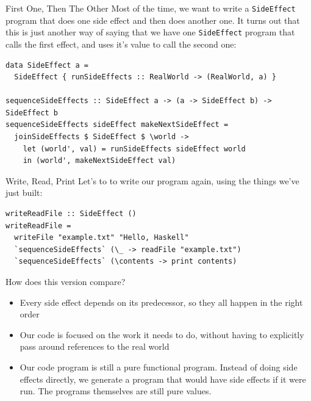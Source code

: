 \documentclass[10pt, presentation, colorlinks]{beamer}
\begin{document}
\begin{frame}[label={sec:org6ee2431},fragile]{First One, Then The Other}
 Most of the time, we want to write a \texttt{SideEffect} program that does
one side effect \alert{and then} does another one. It turns out that this is
just another way of saying that we have one \texttt{SideEffect} program that
calls the first effect, and uses it's value to call the second one:

\begin{verbatim}
data SideEffect a =
  SideEffect { runSideEffects :: RealWorld -> (RealWorld, a) }

sequenceSideEffects :: SideEffect a -> (a -> SideEffect b) -> SideEffect b
sequenceSideEffects sideEffect makeNextSideEffect =
  joinSideEffects $ SideEffect $ \world ->
    let (world', val) = runSideEffects sideEffect world
    in (world', makeNextSideEffect val)
\end{verbatim}
\end{frame}

\begin{frame}[label={sec:org48d9e75},fragile]{Write, Read, Print}
 Let's to to write our program again, using the things we've just built:

\begin{verbatim}
writeReadFile :: SideEffect ()
writeReadFile =
  writeFile "example.txt" "Hello, Haskell"
  `sequenceSideEffects` (\_ -> readFile "example.txt")
  `sequenceSideEffects` (\contents -> print contents)
\end{verbatim}

\bigskip

How does this version compare?

\bigskip

\pause
\begin{itemize}
\item Every side effect depends on its predecessor, so they all happen in the right order
\end{itemize}
\pause
\begin{itemize}
\item Our code is focused on the work it needs to do, without having to explicitly pass around references to the real world
\end{itemize}
\pause
\begin{itemize}
\item Our code program is still a \alert{pure functional program}. Instead of doing side effects directly, we \alert{generate a program} that would have side effects if it were run. The programs themselves are still pure values.
\end{itemize}
\end{frame}
\end{document}
